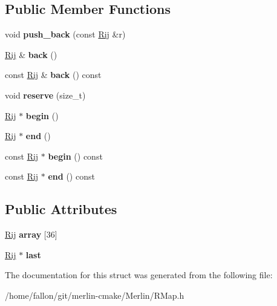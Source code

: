 \subsection*{Public Member Functions}
\begin{DoxyCompactItemize}
\item 
\mbox{\label{structRMap_1_1LinearTermArray_a19080d2a593944807c6fa8fb46971b38}} 
void {\bfseries push\+\_\+back} (const \hyperlink{structRMap_1_1Rij}{Rij} \&r)
\item 
\mbox{\label{structRMap_1_1LinearTermArray_a85139a3016751ab62cd24d2d34493950}} 
\hyperlink{structRMap_1_1Rij}{Rij} \& {\bfseries back} ()
\item 
\mbox{\label{structRMap_1_1LinearTermArray_aa7b23415315192b652c8de4bfc6eea98}} 
const \hyperlink{structRMap_1_1Rij}{Rij} \& {\bfseries back} () const
\item 
\mbox{\label{structRMap_1_1LinearTermArray_a241a1e30ce33700fd1ac523476429298}} 
void {\bfseries reserve} (size\+\_\+t)
\item 
\mbox{\label{structRMap_1_1LinearTermArray_ac37a88d44f339d3348d794030e37738f}} 
\hyperlink{structRMap_1_1Rij}{Rij} $\ast$ {\bfseries begin} ()
\item 
\mbox{\label{structRMap_1_1LinearTermArray_ac8ecbf490924e293eae2f42f1a6f5922}} 
\hyperlink{structRMap_1_1Rij}{Rij} $\ast$ {\bfseries end} ()
\item 
\mbox{\label{structRMap_1_1LinearTermArray_a2d28bdae880865b4ac84dd61d279438e}} 
const \hyperlink{structRMap_1_1Rij}{Rij} $\ast$ {\bfseries begin} () const
\item 
\mbox{\label{structRMap_1_1LinearTermArray_a8ee1800dbb2ce47eeebc09a2d90d5d04}} 
const \hyperlink{structRMap_1_1Rij}{Rij} $\ast$ {\bfseries end} () const
\end{DoxyCompactItemize}
\subsection*{Public Attributes}
\begin{DoxyCompactItemize}
\item 
\mbox{\label{structRMap_1_1LinearTermArray_a2dfce51c07536313f1ee158c46d6e5f3}} 
\hyperlink{structRMap_1_1Rij}{Rij} {\bfseries array} \mbox{[}36\mbox{]}
\item 
\mbox{\label{structRMap_1_1LinearTermArray_a8cca25ec6bcb7a0440f33788a879306b}} 
\hyperlink{structRMap_1_1Rij}{Rij} $\ast$ {\bfseries last}
\end{DoxyCompactItemize}


The documentation for this struct was generated from the following file\+:\begin{DoxyCompactItemize}
\item 
/home/fallon/git/merlin-\/cmake/\+Merlin/R\+Map.\+h\end{DoxyCompactItemize}
